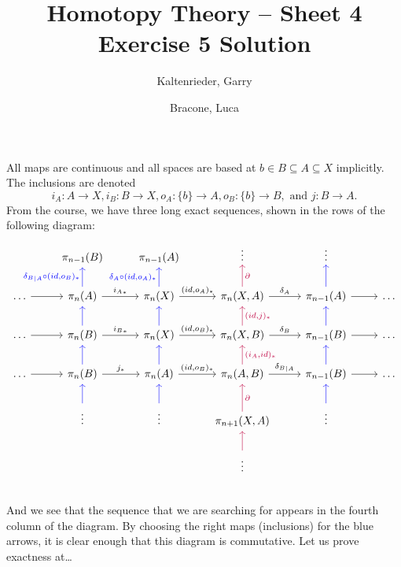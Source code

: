 \documentclass{scrartcl}
\title{Homotopy Theory -- Sheet 4 Exercise 5 Solution}
\author{Kaltenrieder, Garry \\
        \and
        Bracone, Luca}
\begin{document}
\maketitle
All maps are continuous and all spaces are based at $b \in B \subseteq A
	\subseteq X$ implicitly. The inclusions are denoted \[i_A: A \to X, i_B: B \to
	X, o_A: \{b\} \to A, o_B: \{b\} \to B, \text{ and } j: B \to A.\] From the
course, we have three long exact sequences, shown in the rows of the following
diagram:
\[
	\begin{tikzcd}
		&\pi_{n-1}(B) &\pi_{n-1}(A) &\vdots &\vdots & \\
		\dots \rar{} &\pi_n(A) \uar[blue]{ {\delta_B}_{|A} \circ (id, o_B)_*} \rar{{i_A}_*} &\pi_n(X) \uar[blue]{\delta_A \circ (id, o_A)_*} \rar{(id,{o_A})_*} &\pi_n(X,A) \uar[purple, swap]{\partial} \rar{\delta_A} &\pi_{n-1}(A) \uar[blue]{} \rar{} &\dots \\
		\dots \rar{} &\pi_n(B) \uar[blue]{} \rar{{i_B}_*} &\pi_n(X) \uar[blue]{} \rar{(id,{o_B})_*} &\pi_n(X,B) \uar[purple, swap]{(id, j)_*} \rar{\delta_B} &\pi_{n-1}(B) \uar[blue]{} \rar{} &\dots \\
		\dots \rar{} &\pi_n(B) \uar[blue]{} \rar{j_*}     &\pi_n(A) \uar[blue]{} \rar{(id,{o_B})_*} &\pi_n(A,B) \uar[purple, swap]{(i_A, id)_*} \rar{{\delta_B}_{|A}} &\pi_{n-1}(B) \uar[blue]{} \rar{} &\dots \\
		&\vdots \uar[blue] & \vdots \uar[blue] &\pi_{n+1}(X,A) \uar[purple, swap]{\partial} &\vdots \uar[blue] & \\
		& & &\vdots \uar[purple]{} & & \\
	\end{tikzcd}
\]
And we see that the sequence that we are searching for appears in the fourth
column of the diagram.  By choosing
the right maps (inclusions) for the blue arrows, it is clear enough that this
diagram is commutative. %
Let us prove exactness at\dots
\end{document}
